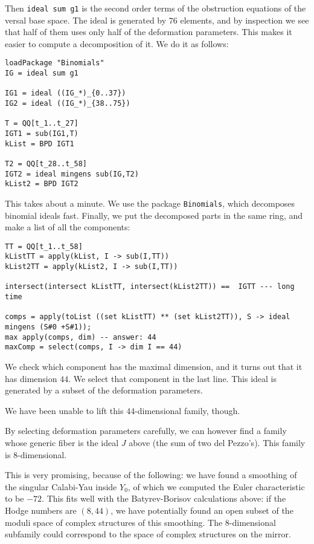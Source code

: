 \documentclass[11pt, english]{article}
\begin{document}
Then \texttt{ideal sum g1} is the second order terms of the obstruction equations of the versal base space. The ideal is generated by $76$ elements, and by inspection we see that half of them uses only half of the deformation parameters. This makes it easier to compute a decomposition of it. We do it as follows:

\begin{lstlisting}
loadPackage "Binomials"
IG = ideal sum g1

IG1 = ideal ((IG_*)_{0..37})
IG2 = ideal ((IG_*)_{38..75})

T = QQ[t_1..t_27]
IGT1 = sub(IG1,T)
kList = BPD IGT1

T2 = QQ[t_28..t_58]
IGT2 = ideal mingens sub(IG,T2)
kList2 = BPD IGT2
\end{lstlisting}

This takes about a minute. We use the package \texttt{Binomials}, which decomposes binomial ideals fast. Finally, we put the decomposed parts in the same ring, and make a list of all the components:

\begin{lstlisting}
TT = QQ[t_1..t_58]
kListTT = apply(kList, I -> sub(I,TT))
kList2TT = apply(kList2, I -> sub(I,TT))

intersect(intersect kListTT, intersect(kList2TT)) ==  IGTT --- long time

comps = apply(toList ((set kListTT) ** (set kList2TT)), S -> ideal mingens (S#0 +S#1));
max apply(comps, dim) -- answer: 44
maxComp = select(comps, I -> dim I == 44)
\end{lstlisting}

We check which component has the maximal dimension, and it turns out that it has dimension $44$. We select that component in the last line. This ideal is generated by a subset of the deformation parameters.

We have been unable to lift this $44$-dimensional family, though. 

By selecting deformation parameters carefully, we can however find a family whose generic fiber is the ideal $J$ above (the sum of two del Pezzo's). This family is $8$-dimensional.

\begin{remark}
This is very promising, because of the following: we have found a smoothing of the singular Calabi-Yau inside $Y_0$, of which we computed the Euler characteristic to be $-72$. This fits well with the Batyrev-Borisov calculations above: if the Hodge numbers are $(8,44)$, we have potentially found an open subset of the moduli space of complex structures of this smoothing. The $8$-dimensional subfamily could correspond to the space of complex structures on the mirror.
\end{remark}
\end{document}
